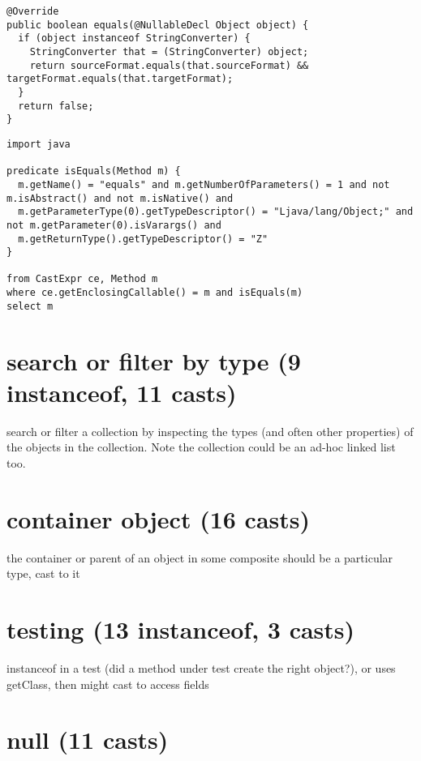 \lstset{language=java,label= ,caption= ,captionpos=b,numbers=none}
\begin{lstlisting}
@Override
public boolean equals(@NullableDecl Object object) {
  if (object instanceof StringConverter) {
    StringConverter that = (StringConverter) object;
    return sourceFormat.equals(that.sourceFormat) && targetFormat.equals(that.targetFormat);
  }
  return false;
}
\end{lstlisting}

\lstset{language=ql,label= ,caption= ,captionpos=b,numbers=none}
\begin{lstlisting}
import java

predicate isEquals(Method m) {
  m.getName() = "equals" and m.getNumberOfParameters() = 1 and not m.isAbstract() and not m.isNative() and
  m.getParameterType(0).getTypeDescriptor() = "Ljava/lang/Object;" and not m.getParameter(0).isVarargs() and
  m.getReturnType().getTypeDescriptor() = "Z"
}

from CastExpr ce, Method m
where ce.getEnclosingCallable() = m and isEquals(m)
select m
\end{lstlisting}

\section{search or filter by type (9 instanceof, 11 casts)}
\label{sec:org3623e52}
search or filter a collection by inspecting the types (and often other properties) of the objects in the collection. Note the collection could be an ad-hoc linked list too. 

\section{container object (16 casts)}
\label{sec:orga64a7a6}
the container or parent of an object in some composite should be a particular type, cast to it 

\section{testing (13 instanceof, 3 casts)}
\label{sec:orgbe367ed}
instanceof in a test (did a method under test create the right object?), or uses getClass, then might cast to access fields 

\section{null (11 casts)}
\label{sec:orgfe4e962}

